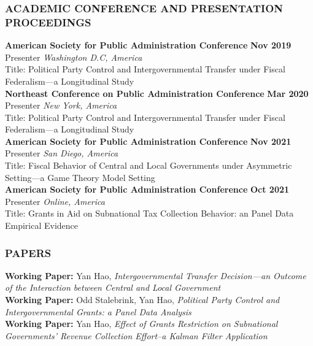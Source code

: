 \subsubsection*{ACADEMIC CONFERENCE AND PRESENTATION PROCEEDINGS}
\noindent \textbf{American Society for Public Administration Conference} \hfill \textbf{Nov 2019} \\
Presenter \hfill \textit{Washington D.C, America}\\
Title: Political Party Control and Intergovernmental Transfer under Fiscal Federalism—a Longitudinal Study
\\[12pt]
\noindent \textbf{Northeast Conference on Public Administration Conference} \hfill \textbf{Mar 2020} \\
Presenter \hfill \textit{New York, America}\\
Title: Political Party Control and Intergovernmental Transfer under Fiscal Federalism—a Longitudinal Study
\\[12pt]
\noindent \textbf{American Society for Public Administration Conference} \hfill \textbf{Nov 2021} \\
Presenter \hfill \textit{San Diego, America}\\
Title: Fiscal Behavior of Central and Local Governments under Asymmetric Setting—a Game Theory Model Setting
\\[12pt]
\noindent \textbf{American Society for Public Administration Conference} \hfill \textbf{Oct 2021} \\
Presenter \hfill \textit{Online, America}\\
Title: Grants in Aid on Subnational Tax Collection Behavior: an Panel Data Empirical Evidence
\\[8pt]
% 

\subsubsection*{PAPERS}
\noindent \textbf{Working Paper:} Yan Hao, \textit{Intergovernmental Transfer Decision---an Outcome of the Interaction between Central and Local Government}
\\[12pt]
\noindent \textbf{Working Paper:} Odd Stalebrink, Yan Hao, \textit{Political Party Control and Intergovernmental Grants: a Panel Data Analysis}
\\[12pt]
\noindent \textbf{Working Paper:} Yan Hao, \textit{Effect of Grants Restriction on Subnational Governments' Revenue Collection Effort--a Kalman Filter Application}

